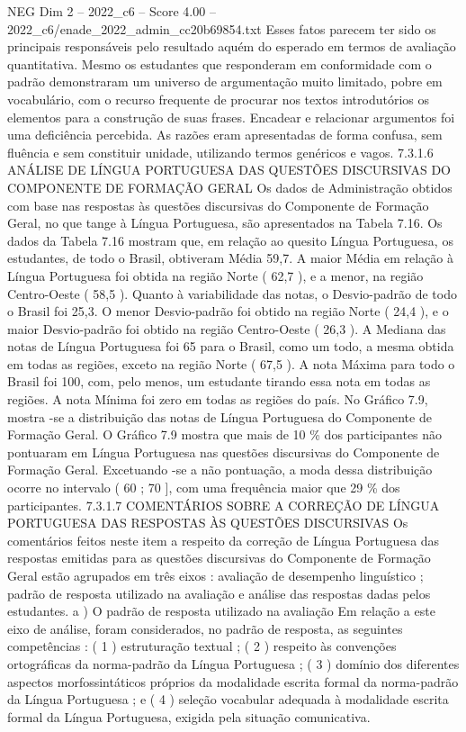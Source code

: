 \begin{textsample}{NEG Dim 2 – 2022\_c6 – Score 4.00 – 2022\_c6/enade\_2022\_admin\_cc20b69854.txt}
Esses fatos parecem ter sido os principais responsáveis pelo resultado aquém do esperado em termos de avaliação quantitativa.
Mesmo os estudantes que responderam em conformidade com o padrão demonstraram um universo de argumentação muito limitado, pobre em vocabulário, com o recurso frequente de procurar nos textos introdutórios os elementos para a construção de suas frases.
Encadear e relacionar argumentos foi uma deficiência percebida.
As razões eram apresentadas de forma confusa, sem fluência e sem constituir unidade, utilizando termos genéricos e vagos. 7.3.1.6 ANÁLISE DE LÍNGUA PORTUGUESA DAS QUESTÕES DISCURSIVAS DO COMPONENTE DE FORMAÇÃO GERAL Os dados de Administração obtidos com base nas respostas às questões discursivas do Componente de Formação Geral, no que tange à Língua Portuguesa, são apresentados na Tabela 7.16.
Os dados da Tabela 7.16 mostram que, em relação ao quesito Língua Portuguesa, os estudantes, de todo o Brasil, obtiveram Média 59,7.
A maior Média em relação à Língua Portuguesa foi obtida na região Norte ( 62,7 ), e a menor, na região Centro-Oeste ( 58,5 ).
Quanto à variabilidade das notas, o Desvio-padrão de todo o Brasil foi 25,3.
O menor Desvio-padrão foi obtido na região Norte ( 24,4 ), e o maior Desvio-padrão foi obtido na região Centro-Oeste ( 26,3 ).
A Mediana das notas de Língua Portuguesa foi 65 para o Brasil, como um todo, a mesma obtida em todas as regiões, exceto na região Norte ( 67,5 ).
A nota Máxima para todo o Brasil foi 100, com, pelo menos, um estudante tirando essa nota em todas as regiões.
A nota Mínima foi zero em todas as regiões do país.
No Gráfico 7.9, mostra -se a distribuição das notas de Língua Portuguesa do Componente de Formação Geral.
O Gráfico 7.9 mostra que mais de 10 \% dos participantes não pontuaram em Língua Portuguesa nas questões discursivas do Componente de Formação Geral.
Excetuando -se a não pontuação, a moda dessa distribuição ocorre no intervalo ( 60 ; 70 ], com uma frequência maior que 29 \% dos participantes. 7.3.1.7 COMENTÁRIOS SOBRE A CORREÇÃO DE LÍNGUA PORTUGUESA DAS RESPOSTAS ÀS QUESTÕES DISCURSIVAS Os comentários feitos neste item a respeito da correção de Língua Portuguesa das respostas emitidas para as questões discursivas do Componente de Formação Geral estão agrupados em três eixos : avaliação de desempenho linguístico ; padrão de resposta utilizado na avaliação e análise das respostas dadas pelos estudantes. a ) O padrão de resposta utilizado na avaliação Em relação a este eixo de análise, foram considerados, no padrão de resposta, as seguintes competências : ( 1 ) estruturação textual ; ( 2 ) respeito às convenções ortográficas da norma-padrão da Língua Portuguesa ; ( 3 ) domínio dos diferentes aspectos morfossintáticos próprios da modalidade escrita formal da norma-padrão da Língua Portuguesa ; e ( 4 ) seleção vocabular adequada à modalidade escrita formal da Língua Portuguesa, exigida pela situação comunicativa.

\end{textsample}
